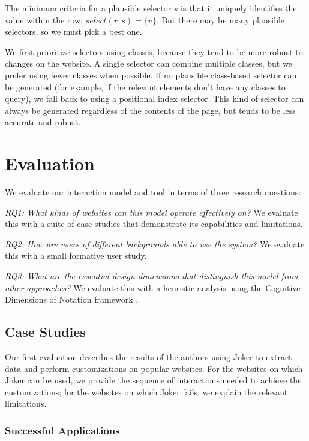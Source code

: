 \documentclass[conference]{IEEEtran}
\begin{document}
The minimum criteria for a plausible selector \(s\) is that it uniquely
identifies the value within the row: \(select(r, s) = \{v\}\). But there
may be many plausible selectors, so we must pick a best one.

We first prioritize selectors using classes, because they tend to be
more robust to changes on the website. A single selector can combine
multiple classes, but we prefer using fewer classes when possible. If no
plausible class-based selector can be generated (for example, if the
relevant elements don't have any classes to query), we fall back to
using a positional index selector. This kind of selector can always be
generated regardless of the contents of the page, but tends to be less
accurate and robust.

\hypertarget{sec:evaluation}{%
\section{Evaluation}\label{sec:evaluation}}

We evaluate our interaction model and tool in terms of three research
questions:

\emph{RQ1: What kinds of websites can this model operate effectively
on?} We evaluate this with a suite of case studies that demonstrate its
capabilities and limitations.

\emph{RQ2: How are users of different backgrounds able to use the
system?} We evaluate this with a small formative user study.

\emph{RQ3: What are the essential design dimensions that distinguish
this model from other approaches?} We evaluate this with a heuristic
analysis using the Cognitive Dimensions of Notation framework
\citep{blackwell2001}.

\hypertarget{case-studies}{%
\subsection{Case Studies}\label{case-studies}}

Our first evaluation describes the results of the authors using Joker to
extract data and perform customizations on popular websites. For the
websites on which Joker can be used, we provide the sequence of
interactions needed to achieve the customizations; for the websites on
which Joker fails, we explain the relevant limitations.

\hypertarget{successful-applications}{%
\subsubsection{Successful Applications}\label{successful-applications}}
\end{document}
